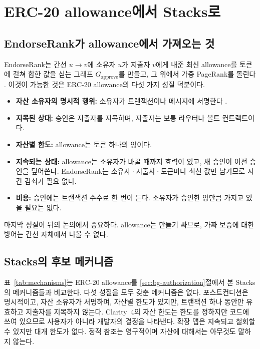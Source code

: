 \section{ERC-20 allowance에서 Stacks로}
\label{sec:mapping}

\subsection{EndorseRank가 allowance에서 가져오는 것}

EndorseRank는 간선 $u\to v$에 소유자 $u$가 지출자 $v$에게 내준 최신 allowance를 토큰에 걸쳐 합한 값을 싣는 그래프 $G_{\mathrm{approve}}$를 만들고, 그 위에서 가중 PageRank를 돌린다 \cite{kwon2026endorserank}. 이것이 가능한 것은 ERC-20 allowance의 다섯 가지 성질 덕분이다.

\begin{itemize}
\item \textbf{자산 소유자의 명시적 행위:} 소유자가  트랜잭션이나  메시지에 서명한다 \cite{eip20,eip2612}.
\item \textbf{지목된 상대:} 승인은 지출자를 지목하며, 지출자는 보통 라우터나 볼트 컨트랙트이다.
\item \textbf{자산별 한도:} allowance는 토큰 하나의 양이다.
\item \textbf{지속되는 상태:} allowance는 소유자가 바꿀 때까지 효력이 있고, 새 승인이 이전 승인을 덮어쓴다. EndorseRank는 소유자·지출자·토큰마다 최신 값만 남기므로 시간 감쇠가 필요 없다.
\item \textbf{비용:} 승인에는 트랜잭션 수수료 한 번이 든다. 소유자가 승인한 양만큼 가지고 있을 필요는 없다.
\end{itemize}

마지막 성질이 뒤의 논의에서 중요하다. allowance는 만들기 싸므로, 가짜 보증에 대한 방어는 간선 자체에서 나올 수 없다.

\subsection{Stacks의 후보 메커니즘}

표~\ref{tab:mechanisms}는 ERC-20 allowance를 \ref{sec:bg-authorization}절에서 본 Stacks의 메커니즘들과 비교한다. 다섯 성질을 모두 갖춘 메커니즘은 없다. 포스트컨디션은 명시적이고, 자산 소유자가 서명하며, 자산별 한도가 있지만, 트랜잭션 하나 동안만 유효하고 지출자를 지목하지 않는다. Clarity~4의 자산 한도는 한도를 정하지만 코드에 쓰여 있으므로 사용자가 아니라 개발자의 결정을 나타낸다. 확장 맵은 지속되고 철회할 수 있지만 대개 한도가 없다. 정적 참조는 영구적이며 자산에 대해서는 아무것도 말하지 않는다.

